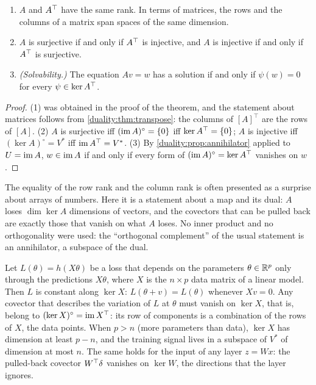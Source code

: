 \begin{notechapter}
\begin{corollary}
\label{duality:cor:rank}
\begin{enumerate}[nosep]
  \item $A$ and $A^{\top}$ have the same rank. In terms of matrices, the
        rows and the columns of a matrix span spaces of the same
        dimension.
  \item $A$ is surjective if and only if $A^{\top}$ is injective, and $A$
        is injective if and only if $A^{\top}$ is surjective.
  \item \emph{(Solvability.)} The equation $Av = w$ has a solution if and
        only if $\psi(w) = 0$ for every $\psi\in\ker A^{\top}$.
\end{enumerate}
\end{corollary}

\begin{proof}
(1) was obtained in the proof of the theorem, and the statement about
matrices follows from \cref{duality:thm:transpose}: the columns of
$[A]^\top$ are the rows of $[A]$. (2) $A$ is surjective iff
$(\operatorname{im} A)^\circ = \{0\}$ iff $\ker A^{\top} = \{0\}$; $A$ is injective iff
$(\ker A)^\circ = V^*$ iff $\operatorname{im}A^{\top} = V^*$. (3) By
\cref{duality:prop:annihilator} applied to $U = \operatorname{im} A$, $w\in\operatorname{im} A$ if and
only if every form of $(\operatorname{im} A)^\circ = \ker A^{\top}$ vanishes on $w$.
\end{proof}

\begin{intuition}
The equality of the row rank and the column rank is often presented as a
surprise about arrays of numbers. Here it is a statement about a map and
its dual: $A$ loses $\dim\ker A$ dimensions of vectors, and the covectors
that can be pulled back are exactly those that vanish on what $A$ loses.
No inner product and no orthogonality were used: the ``orthogonal
complement'' of the usual statement is an annihilator, a subspace of the
dual.
\end{intuition}

\begin{mlthread}
Let $L(\theta) = h(X\theta)$ be a loss that depends on the parameters
$\theta\in\mathbb{R}^p$ only through the predictions $X\theta$, where $X$ is the
$n\times p$ data matrix of a linear model. Then $L$ is constant along
$\ker X$: $L(\theta + v) = L(\theta)$ whenever $Xv = 0$. Any covector that
describes the variation of $L$ at $\theta$ must vanish on $\ker X$, that
is, belong to $(\ker X)^\circ = \operatorname{im}X^{\top}$: its row of components is a
combination of the rows of $X$, the data points. When $p > n$ (more
parameters than data), $\ker X$ has dimension at least $p - n$, and the
training signal lives in a subspace of $V^*$ of dimension at most $n$. The
same holds for the input of any layer $z = Wx$: the pulled-back covector
$W^{\top}\delta$ vanishes on $\ker W$, the directions that the layer
ignores.
\end{mlthread}


\end{notechapter}
